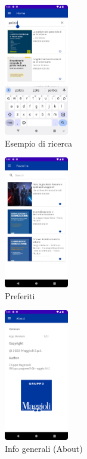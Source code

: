 \begin{multicols}{3}
            \begin{figure}[H]
                \centering
                \includegraphics[width=0.25\textwidth]{img/ricerca.png}
                \caption{Esempio di ricerca}
                \label{ricerca-android}
            \end{figure}

            \begin{figure}[H]
                \centering
                \includegraphics[width=0.25\textwidth]{img/preferiti.png}
                \caption{Preferiti}
                \label{preferiti-android}
            \end{figure}

            \begin{figure}[H]
                \centering
                \includegraphics[width=0.25\textwidth]{img/about.png}
                \caption{Info generali (About)}
                \label{about-android}
            \end{figure}


\end{multicols}
